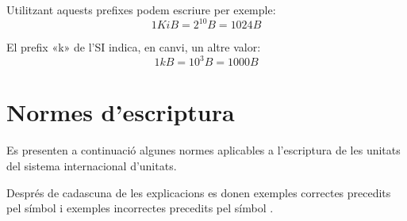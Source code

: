 Utilitzant aquests prefixes podem escriure per exemple:
\[1\unit{KiB} =2^{10}\unit{B} = 1024\unit{B}\]

El prefix «k» de l'SI indica, en canvi, un altre valor:
\[1\unit{kB} =10^3\unit{B} = 1000\unit{B}\]

\section{Normes d'escriptura}

Es presenten a continuació algunes normes aplicables a l'escriptura
de les unitats del sistema internacional d'unitats.

Després de cadascuna de les explicacions es donen exemples correctes precedits pel símbol \textcolor{Green}\faCheckSquare{} i exemples incorrectes precedits pel símbol \textcolor{Red}\faTimesCircle{}.

